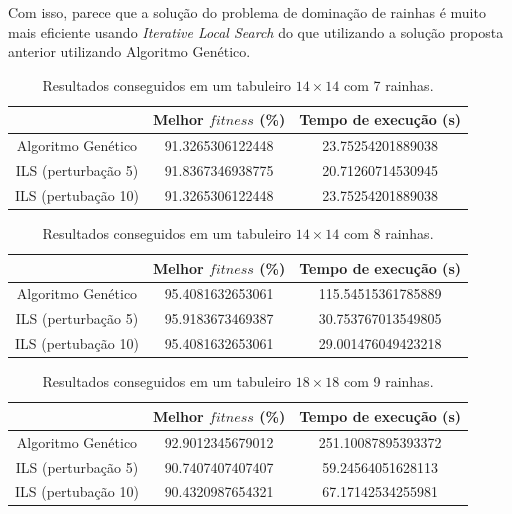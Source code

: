 \documentclass[
	article,			%
	11pt,				%
	oneside,			%
	a4paper,			%
	english,			%
	brazil,				%
	sumario=tradicional
	]{abntex2}
\begin{document}
Com isso, parece que a solução do problema de dominação de rainhas é muito mais eficiente usando \textit{Iterative Local Search} do que utilizando a solução proposta anterior utilizando Algoritmo Genético.

  \begin{table}[ht]
    \caption{Resultados conseguidos em um tabuleiro $14 \times 14$ com 7 rainhas.}
    \centering
    \begin{tabular}{|c|c c|}
      \hline
      & Melhor $fitness$ (\%) & Tempo de execução (s) \\
      \hline
      Algoritmo Genético & 91.3265306122448 & 23.75254201889038 \\
      ILS (perturbação 5) & 91.8367346938775 & 20.71260714530945 \\
      ILS (pertubação 10) & 91.3265306122448 & 23.75254201889038 \\
      \hline
    \end{tabular}
    \label{tabela2}
  \end{table}

\begin{table}[ht]
  \caption{Resultados conseguidos em um tabuleiro $14 \times 14$ com 8 rainhas.}
  \centering
  \begin{tabular}{|c|c c|}
    \hline
     & Melhor $fitness$ (\%) & Tempo de execução (s) \\
     \hline
    Algoritmo Genético & 95.4081632653061 & 115.54515361785889 \\
    ILS (perturbação 5) & 95.9183673469387 & 30.753767013549805 \\
    ILS (pertubação 10) & 95.4081632653061 & 29.001476049423218 \\
    \hline
  \end{tabular}
  \label{tabela3}
\end{table}

\begin{table}[ht]
  \caption{Resultados conseguidos em um tabuleiro $18 \times 18$ com 9 rainhas.}
  \centering
  \begin{tabular}{| c|c c|}
    \hline
     & Melhor $fitness$ (\%) & Tempo de execução (s) \\
     \hline
    Algoritmo Genético & 92.9012345679012 & 251.10087895393372 \\
    ILS (perturbação 5) & 90.7407407407407 & 59.24564051628113 \\
    ILS (pertubação 10) & 90.4320987654321 & 67.17142534255981 \\
    \hline
  \end{tabular}
  \label{tabela4}
\end{table}
\end{document}
